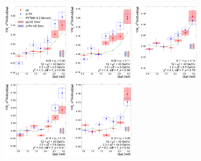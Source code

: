  \begin{figure}
     \centering
     \includegraphics[width=0.3\textwidth]{Data_Analysis/gammahadron/Cs_Final_Indv_pT_0_zT_0.pdf}
    \includegraphics[width=0.3\textwidth]{Data_Analysis/gammahadron/Cs_Final_Indv_pT_0_zT_1.pdf}        
    \includegraphics[width=0.3\textwidth]{Data_Analysis/gammahadron/Cs_Final_Indv_pT_0_zT_2.pdf}        
    \includegraphics[width=0.3\textwidth]{Data_Analysis/gammahadron/Cs_Final_Indv_pT_0_zT_3.pdf}        
    \includegraphics[width=0.3\textwidth]{Data_Analysis/gammahadron/Cs_Final_Indv_pT_0_zT_4.pdf}        

\end{figure}
